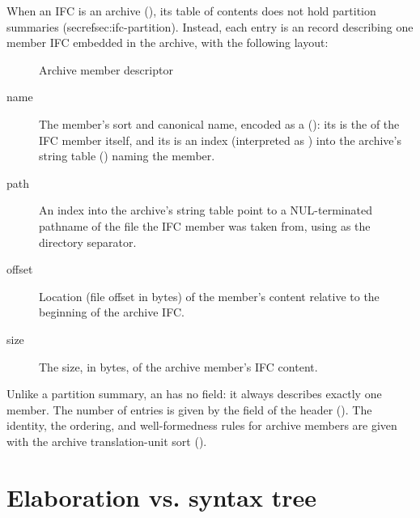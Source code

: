 When an IFC is an archive (), its table of contents does not
hold partition summaries (secref{sec:ifc-partition}).  Instead, each entry is an 
record describing  one member IFC embedded in the archive, with the following layout:
%
\begin{figure}[H]
	\centering
	\caption{Archive member descriptor}
	\label{fig:ifc-archive-member}
\end{figure}
%
\begin{description}
\item[name] The member's sort and canonical name, encoded as a 
	(): its  is the  of the IFC member itself,
	and its  is an index (interpreted as ) into the archive's
	string table () naming the member.

\item[path] An index into the archive's string table point to a NUL-terminated pathname of the 
	file the IFC member was taken from, using \code{/} as the directory separator.

\item[offset] Location (file offset in bytes) of the member's content relative to the beginning of the archive IFC.

\item[size]  The size, in bytes, of the archive member's IFC content.
\end{description}

Unlike a partition summary, an  has no  field: it always describes 
exactly one member.  The number of  entries is given by the  field
of the header ().  The identity, the ordering, and well-formedness rules for 
archive members are given with the archive translation-unit sort ().

\section{Elaboration vs. syntax tree}
\label{sec:ifc-elaboration-vs-syntax-tree}

